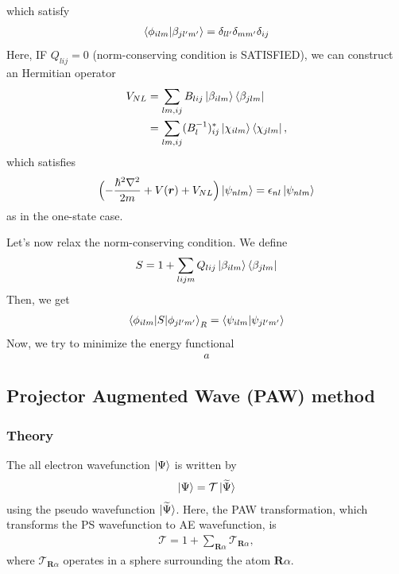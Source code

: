 \documentclass{article}
\begin{document}
which satisfy
\begin{align}
  \braket{\phi_{ilm} | \beta_{jl'm'}} = \delta_{ll'} \delta_{mm'} \delta_{ij}
\end{align}
Here, IF $Q_{lij} = 0$ (norm-conserving condition is SATISFIED), we can construct an Hermitian operator
\begin{align}
  V_{NL} 
  &= 
  \sum_{lm,ij} B_{lij} \ket{\beta_{ilm}} \bra{\beta_{jlm}}
  \nonumber
  \\&=
  \sum_{lm,ij} (B_{l}^{-1})_{ij}^* \ket{\chi_{ilm}} \bra{\chi_{jlm}},
\end{align}
which satisfies
\begin{align}
  \Bigl(
    - \frac{\hbar^2\nabla^2}{2m} + V(\bm{r}) + V_{NL}
  \Bigr)
  \ket{\psi_{nlm}} = \epsilon_{nl}\ket{\psi_{nlm}}
\end{align}
as in the one-state case.

Let's now relax the norm-conserving condition.
We define 
\begin{align}
  S = 1 + \sum_{lijm} Q_{lij} \ket{\beta_{ilm}} \bra{\beta_{jlm}}
\end{align}
Then, we get
\begin{align}
  \braket{\phi_{ilm} | S | \phi_{jl'm'}}_R = \braket{\psi_{ilm} | \psi_{jl'm'}}
\end{align}
Now, we try to minimize the energy functional 
\begin{align}
a
\end{align}


\subsection{Projector Augmented Wave (PAW) method}
\subsubsection{Theory}
The all electron wavefunction $\ket{\Psi}$ is written by 
\begin{align}
\ket{\Psi} = \mathcal{T} \ket{\widetilde{\Psi}}
\end{align}
using the pseudo wavefunction $\ket{\widetilde{\Psi}}$. Here, the PAW transformation, which transforms the PS wavefunction to AE wavefunction, is 
\begin{align}
  \mathcal{T} = 1 + \sum_{\bm{R}\alpha} \mathcal{T}_{\bm{R}\alpha},
\end{align}
where $\mathcal{T}_{\bm{R}\alpha}$ operates in a sphere surrounding the atom $\bm{R}\alpha$.
\end{document}
